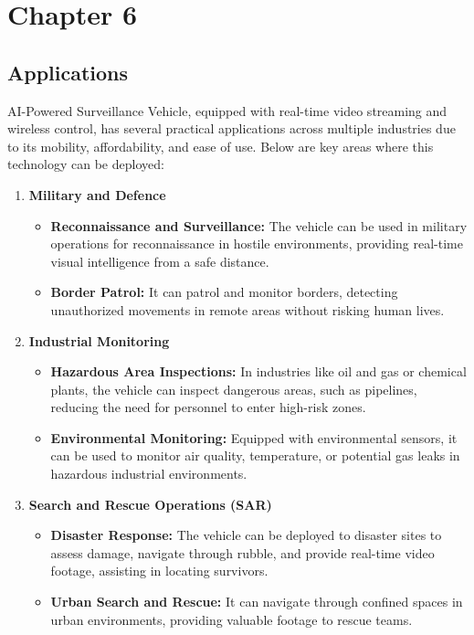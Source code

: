 \documentclass[12pt,a4paper]{report}
\begin{document}
	{\vfill \chapter*{\centering \vfill Chapter 6 \vfill}\vfill}
	\thispagestyle{empty}
	\newpage
	\label{Applications}
	\section{Applications}

AI-Powered Surveillance Vehicle, equipped with real-time video streaming and wireless control, has several practical applications across multiple industries due to its mobility, affordability, and ease of use. Below are key areas where this technology can be deployed:

\begin{enumerate}
    \item \textbf{Military and Defence}
    \begin{itemize}
        \item \textbf{Reconnaissance and Surveillance:} The vehicle can be used in military operations for reconnaissance in hostile environments, providing real-time visual intelligence from a safe distance.
        \item \textbf{Border Patrol:} It can patrol and monitor borders, detecting unauthorized movements in remote areas without risking human lives.
    \end{itemize}
    
    \item \textbf{Industrial Monitoring}
    \begin{itemize}
        \item \textbf{Hazardous Area Inspections:} In industries like oil and gas or chemical plants, the vehicle can inspect dangerous areas, such as pipelines, reducing the need for personnel to enter high-risk zones.
        \item \textbf{Environmental Monitoring:} Equipped with environmental sensors, it can be used to monitor air quality, temperature, or potential gas leaks in hazardous industrial environments.
    \end{itemize}
        
    \item \textbf{Search and Rescue Operations (SAR)}
    \begin{itemize}
        \item \textbf{Disaster Response:} The vehicle can be deployed to disaster sites to assess damage, navigate through rubble, and provide real-time video footage, assisting in locating survivors.
        \item \textbf{Urban Search and Rescue:} It can navigate through confined spaces in urban environments, providing valuable footage to rescue teams.
    \end{itemize}
    

\end{enumerate}
\end{document}
